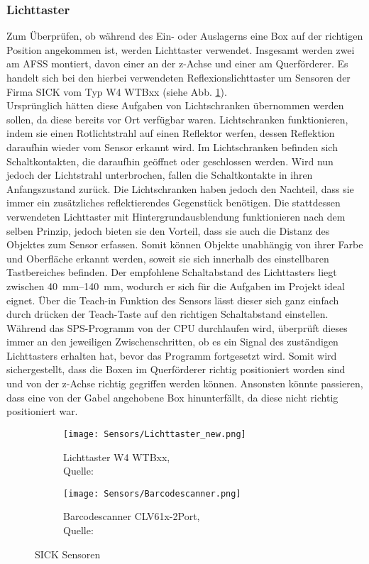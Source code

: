 \subsubsection{Lichttaster}
Zum Überprüfen, ob während des Ein- oder Auslagerns eine Box auf der richtigen Position angekommen ist, werden Lichttaster verwendet. Insgesamt werden zwei am AFSS montiert, davon einer an der z-Achse und einer am Querförderer. Es handelt sich bei den hierbei verwendeten Reflexionslichttaster um Sensoren der Firma SICK vom Typ W4 WTBxx (siehe Abb. \ref{lichttaster}).\\
Ursprünglich hätten diese Aufgaben von Lichtschranken übernommen werden sollen, da diese bereits vor Ort verfügbar waren. Lichtschranken funktionieren, indem sie einen Rotlichtstrahl auf einen Reflektor werfen, dessen Reflektion daraufhin wieder vom Sensor erkannt wird. Im Lichtschranken befinden sich Schaltkontakten, die daraufhin geöffnet oder geschlossen werden. Wird nun jedoch der Lichtstrahl unterbrochen, fallen die Schaltkontakte in ihren Anfangszustand zurück. Die Lichtschranken haben jedoch den Nachteil, dass sie immer ein zusätzliches reflektierendes Gegenstück benötigen. Die stattdessen verwendeten Lichttaster mit Hintergrundausblendung funktionieren nach dem selben Prinzip, jedoch bieten sie den Vorteil, dass sie auch die Distanz des Objektes zum Sensor erfassen. Somit können Objekte unabhängig von ihrer Farbe und Oberfläche erkannt werden, soweit sie sich innerhalb des einstellbaren Tastbereiches befinden.\cite{Lichttaster_und_Schranken} Der empfohlene Schaltabstand des Lichttasters liegt zwischen \qtyrange{40}{140}{\milli\meter}, wodurch er sich für die Aufgaben im Projekt ideal eignet. Über die Teach-in Funktion des Sensors lässt dieser sich ganz einfach durch drücken der Teach-Taste auf den richtigen Schaltabstand einstellen.\cite{Lichttaster_datasheet}\\
Während das SPS-Programm von der CPU durchlaufen wird, überprüft dieses immer an den jeweiligen Zwischenschritten, ob es ein Signal des zuständigen Lichttasters erhalten hat, bevor das Programm fortgesetzt wird. Somit wird sichergestellt, dass die Boxen im Querförderer richtig positioniert worden sind und von der z-Achse richtig gegriffen werden können. Ansonsten könnte passieren, dass eine von der Gabel angehobene Box hinunterfällt, da diese nicht richtig positioniert war.

\begin{figure}[H]
    \centering
    \begin{subfigure}{.4\textwidth}
        \centering
        \texttt{[image: Sensors/Lichttaster\_new.png]}
        \caption{Lichttaster W4 WTBxx,\\ Quelle: \cite{Lichttaster_pic}}
        \label{lichttaster}
    \end{subfigure}
    \begin{subfigure}{.4\textwidth}
        \centering
        \texttt{[image: Sensors/Barcodescanner.png]}
        \caption{Barcodescanner CLV61x-2Port,\\ Quelle: \cite{BarScan_pic}}
        \label{BarScan}
    \end{subfigure}
    \caption{SICK Sensoren}
\end{figure}

